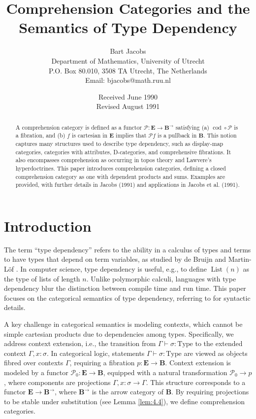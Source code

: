 \documentclass{article}
\title{Comprehension Categories and the Semantics of Type Dependency}
\author{Bart Jacobs \\ Department of Mathematics, University of Utrecht \\ P.O. Box 80.010, 3508 TA Utrecht, The Netherlands \\ Email: bjacobs@math.ruu.nl}
\date{Received June 1990 \\ Revised August 1991}
\theoremstyle{plain}
\theoremstyle{remark}
\begin{document}
\maketitle

\begin{abstract}
A comprehension category is defined as a functor $\mathscr{P}: \mathbf{E} \to \mathbf{B}^{\to}$ satisfying (a) $\operatorname{cod} \circ \mathscr{P}$ is a fibration, and (b) $f$ is cartesian in $\mathbf{E}$ implies that $\mathscr{P} f$ is a pullback in $\mathbf{B}$. This notion captures many structures used to describe type dependency, such as display-map categories, categories with attributes, D-categories, and comprehensive fibrations. It also encompasses comprehension as occurring in topos theory and Lawvere's hyperdoctrines. This paper introduces comprehension categories, defining a closed comprehension category as one with dependent products and sums. Examples are provided, with further details in Jacobs (1991) and applications in Jacobs et al. (1991).
\end{abstract}

\tableofcontents

\newpage
\section{Introduction}

The term ``type dependency'' refers to the ability in a calculus of types and terms to have types that depend on term variables, as studied by de Bruijn \cite{deBruijn1970} and Martin-L\"of \cite{MartinLof1984}. In computer science, type dependency is useful, e.g., to define $\operatorname{List}(n)$ as the type of lists of length $n$. Unlike polymorphic calculi, languages with type dependency blur the distinction between compile time and run time. This paper focuses on the categorical semantics of type dependency, referring to \cite{MartinLof1984, Troelstra1986} for syntactic details.

A key challenge in categorical semantics is modeling contexts, which cannot be simple cartesian products due to dependencies among types. Specifically, we address context extension, i.e., the transition from $\Gamma \vdash \sigma : \text{Type}$ to the extended context $\Gamma, x : \sigma$. In categorical logic, statements $\Gamma \vdash \sigma : \text{Type}$ are viewed as objects fibred over contexts $\Gamma$, requiring a fibration $p : \mathbf{E} \to \mathbf{B}$. Context extension is modeled by a functor $\mathscr{P}_0 : \mathbf{E} \to \mathbf{B}$, equipped with a natural transformation $\mathscr{P}_0 \to p$, where components are projections $\Gamma, x : \sigma \to \Gamma$. This structure corresponds to a functor $\mathbf{E} \to \mathbf{B}^{\to}$, where $\mathbf{B}^{\to}$ is the arrow category of $\mathbf{B}$. By requiring projections to be stable under substitution (see Lemma \ref{lem:4.4}), we define comprehension categories.
\end{document}
